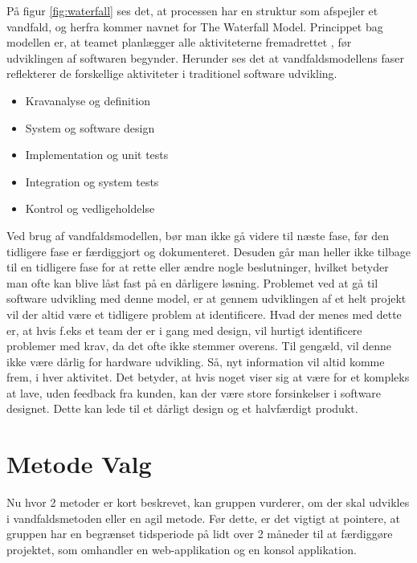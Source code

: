 På figur \ref{fig:waterfall} ses det, at processen har en struktur som afspejler et vandfald, og herfra kommer navnet for The Waterfall Model. Princippet bag modellen er, at teamet planlægger alle aktiviteterne fremadrettet , før udviklingen af softwaren begynder. Herunder ses det at vandfaldsmodellens faser reflekterer de forskellige aktiviteter i traditionel software udvikling.\cite{Sommerville} 
\begin{itemize}
    \item Kravanalyse og definition
    \item System og software design
    \item Implementation og unit tests
    \item Integration og system tests
    \item Kontrol og vedligeholdelse 
\end{itemize}

Ved brug af vandfaldsmodellen, bør man ikke gå videre til næste fase, før den tidligere fase er færdiggjort og dokumenteret. Desuden går man heller ikke tilbage til en tidligere fase for at rette eller ændre nogle beslutninger, hvilket betyder man ofte kan blive låst fast på en dårligere løsning. Problemet ved at gå til software udvikling med denne model, er at gennem udviklingen af et helt projekt vil der altid være et tidligere problem at identificere. Hvad der menes med dette er, at hvis f.eks et team der er i gang med design, vil hurtigt identificere problemer med krav, da det ofte ikke stemmer overens. Til gengæld, vil denne ikke være dårlig for hardware udvikling. Så, nyt information vil altid komme frem, i hver aktivitet. Det betyder, at hvis noget viser sig at være for et kompleks at lave, uden feedback fra kunden, kan der være store forsinkelser i software designet. Dette kan lede til et dårligt design og et halvfærdigt produkt.\cite{Sommerville} 

\section{Metode Valg}

Nu hvor 2 metoder er kort beskrevet, kan gruppen vurderer, om der skal udvikles i vandfaldsmetoden eller en agil metode. Før dette, er det vigtigt at pointere, at gruppen har en begrænset tidsperiode på lidt over 2 måneder til at færdiggøre projektet, som omhandler en web-applikation og en konsol applikation.

